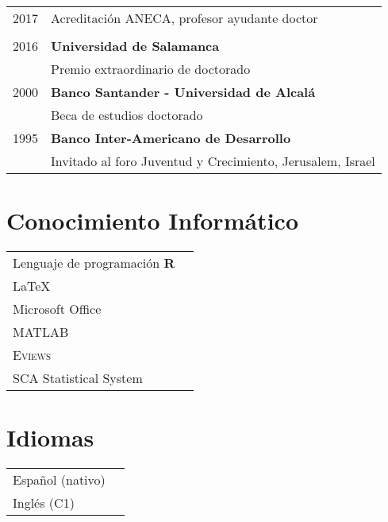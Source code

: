 \documentclass[11pt]{article}\usepackage[]{graphicx}\usepackage[]{color}
\begin{document}
\begin{tabular}{rl}

2017  & Acreditación ANECA, profesor ayudante doctor\\
\\

2016   & \textbf{Universidad de Salamanca}\\
& Premio extraordinario de doctorado\\

2000	 & \textbf{Banco Santander - Universidad de Alcalá}\\
&  Beca de estudios doctorado\\

1995 & \textbf{Banco Inter-Americano de Desarrollo}\\
& Invitado al foro Juventud y Crecimiento, Jerusalem, Israel

\end{tabular}
\vspace{10pt}

\section{Conocimiento Informático} 

\begin{tabular}{ll}

Lenguaje de programación \textbf{\textsf{R}}\\
{\LaTeX}\\
Microsoft Office\\
\textsc{MATLAB}\\
\textsc{Eviews}\\
SCA Statistical System\\

\end{tabular}
\vspace{10pt}

\section{Idiomas} 

\begin{tabular}{ll}
Español (nativo)\\
Inglés (C1) 

\end{tabular}
\end{document}
